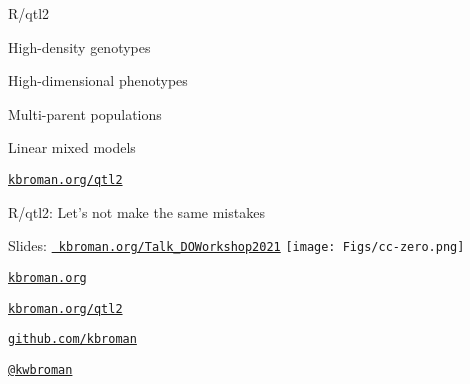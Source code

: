 \documentclass[12pt,t,aspectratio=169]{beamer}
\begin{document}
\begin{frame}[c]{R/qtl2}

\vspace*{-16.2mm}

  \vspace{21mm}

  \bbi
\item High-density genotypes
\item High-dimensional phenotypes
\item Multi-parent populations
\item Linear mixed models
  \ei

  \vspace{25mm}

\hfill \href{https://kbroman.org/qtl2}{\small \tt kbroman.org/qtl2}

\end{frame}



\begin{frame}[c]{R/qtl2: \color{foreground} Let's not make the same mistakes}

  \bbi
{}
\ei

\end{frame}




\begin{frame}[c]{}

\Large

{Slides:} \href{https://kbroman.org/Talk_DOWorkshop2021}{\tt
  \color{foreground} kbroman.org/Talk\_DOWorkshop2021} \quad
\texttt{[image: Figs/cc-zero.png]}

\vspace{7mm}

\href{https://kbroman.org}{\tt kbroman.org}

\vspace{7mm}

\href{https://kbroman.org/qtl2}{\tt kbroman.org/qtl2}

\vspace{7mm}

\href{https://github.com/kbroman}{\tt github.com/kbroman}

\vspace{7mm}

\href{https://twitter.com/kwbroman}{\tt @kwbroman}


\end{frame}
\end{document}

